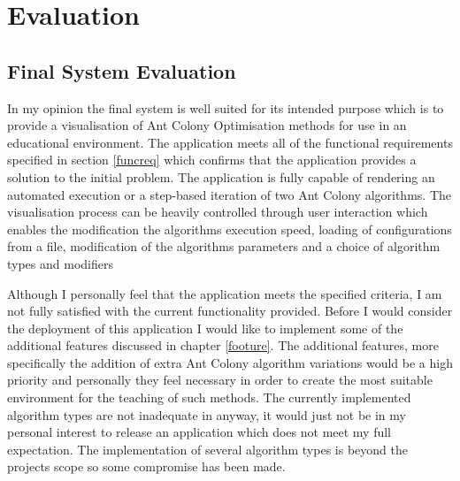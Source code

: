\chapter{Evaluation}

\section{Final System Evaluation}

In my opinion the final system is well suited for its intended purpose which is to provide a visualisation of Ant Colony Optimisation methods for use in an educational environment. The application meets all of the functional requirements specified in section \ref{funcreq} which confirms that the application provides a solution to the initial problem. The application is fully capable of rendering an automated execution or a step-based iteration of two Ant Colony algorithms. The visualisation process can be heavily controlled through user interaction which enables the modification the algorithms execution speed, loading of configurations from a file, modification of the algorithms parameters and a choice of algorithm types and modifiers

Although I personally feel that the application meets the specified criteria, I am not fully satisfied with the current functionality provided. Before I would consider the deployment of this application I would like to implement some of the additional features discussed in chapter \ref{footure}. The additional features, more specifically the addition of extra Ant Colony algorithm variations would be a high priority and personally they feel necessary in order to create the most suitable environment for the teaching of such methods. The currently implemented algorithm types are not inadequate in anyway, it would just not be in my personal interest to release an application which does not meet my full expectation. The implementation of several algorithm types is beyond the projects scope so some compromise has been made.

